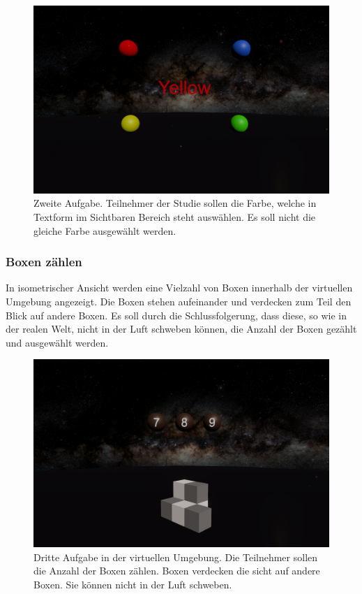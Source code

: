 \begin{figure}
	\includegraphics[width=\textwidth]{./images/matching.png}
	\caption{Zweite Aufgabe. Teilnehmer der Studie sollen die Farbe, welche in Textform im Sichtbaren Bereich steht auswählen. Es soll nicht die gleiche Farbe ausgewählt werden.}
	\label{fig:matching}
\end{figure}

\subsubsection{Boxen zählen} 
In isometrischer Ansicht werden eine Vielzahl von Boxen innerhalb der virtuellen Umgebung angezeigt. Die Boxen stehen aufeinander und verdecken zum Teil den Blick auf andere Boxen. Es soll durch die Schlussfolgerung, dass diese, so wie in der realen Welt, nicht in der Luft schweben können, die Anzahl der Boxen gezählt und ausgewählt werden.

\begin{figure}
	\includegraphics[width=\textwidth]{./images/counting.png}
	\caption{Dritte Aufgabe in der virtuellen Umgebung. Die Teilnehmer sollen die Anzahl der Boxen zählen. Boxen verdecken die sicht auf andere Boxen. Sie können nicht in der Luft schweben.}
	\label{fig:counting}
\end{figure}

